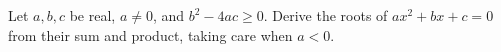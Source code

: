 Let $a,b,c$ be real, $a\ne0$, and $b^2-4ac\ge0$. Derive the roots of $ax^2+bx+c=0$ from their sum and product, taking care when $a<0$.
